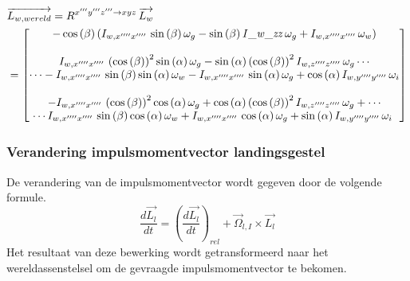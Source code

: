 \begin{align*}
&\overrightarrow{L_{w,wereld}}=R^{x'''y'''z''' \rightarrow xyz}\,\overrightarrow{L_{w}}\\
&=\begin{bmatrix}
-\cos \left( \beta \right)  \left( {I_{w,x''''x''''}}\,\sin \left( \beta \right) \omega_{g}-\sin \left( \beta\right) {\it I\_w\_zz}\,\omega_{g}+{I_{w,x''''x''''}}\,\omega_{w}
\right)
\\ 
\\
{I_{w,x''''x''''}}\, \left( \cos \left( \beta \right)  \right) ^{2}\sin \left( \alpha \right) \omega_{g}-\sin\left( \alpha \right)  \left( \cos \left( \beta \right)  \right) ^{2}
{I_{w,z''''z''''}}\,\omega_{g} \cdots\\
\cdots -{I_{w,x''''x''''}}\,\sin \left( \beta \right) \sin \left( \alpha \right) \omega_{w}-{I_{w,x''''x''''}}\,\sin \left( \alpha \right) \omega_{g}+\cos \left( \alpha \right) {I_{w,y''''y''''}}\,\omega_{i}
\\ 
\\
-{I_{w,x''''x''''}}\, \left( \cos \left( \beta \right)  \right) ^{2}\cos \left( \alpha \right) \omega_{g}+\cos\left( \alpha \right)  \left( \cos \left( \beta \right)  \right) ^{2}
{I_{w,z''''z''''}}\,\omega_{g}+\cdots \\
\cdots{I_{w,x''''x''''}}\,\sin \left( \beta \right) \cos \left( \alpha \right) \omega_{w}+{I_{w,x''''x''''}}\,\cos \left( \alpha \right) \omega_{g}+\sin \left( \alpha \right) {I_{w,y''''y''''}}\,\omega_{i}\
\end{bmatrix}
\end{align*}

\subsubsection{Verandering impulsmomentvector landingsgestel}
De verandering van de impulsmomentvector wordt gegeven door de volgende formule. 
\begin{equation}
\frac{d\overrightarrow{L_{l}}}{dt}=\left(\frac{d\overrightarrow{L_{l}}}{dt}\right)_{rel}+\overrightarrow{\Omega}_{l,I}\times \overrightarrow{L_{l}}
\end{equation}
Het resultaat van deze bewerking wordt getransformeerd naar het wereldassenstelsel om de gevraagde impulsmomentvector te bekomen.

